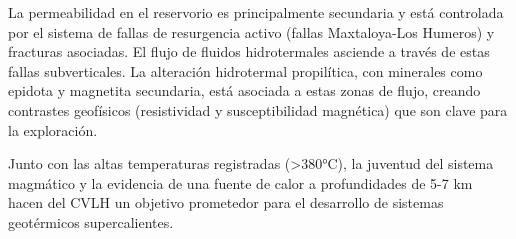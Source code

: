 La permeabilidad en el reservorio es principalmente secundaria y está controlada por el sistema de fallas de resurgencia activo (fallas Maxtaloya-Los Humeros) y fracturas asociadas. El flujo de fluidos hidrotermales asciende a través de estas fallas subverticales. La alteración hidrotermal propilítica, con minerales como epidota y magnetita secundaria, está asociada a estas zonas de flujo, creando contrastes geofísicos (resistividad y susceptibilidad magnética) que son clave para la exploración.

Junto con las altas temperaturas registradas (>380°C), la juventud del sistema magmático y la evidencia de una fuente de calor a profundidades de 5-7 km hacen del CVLH un objetivo prometedor para el desarrollo de sistemas geotérmicos supercalientes.
